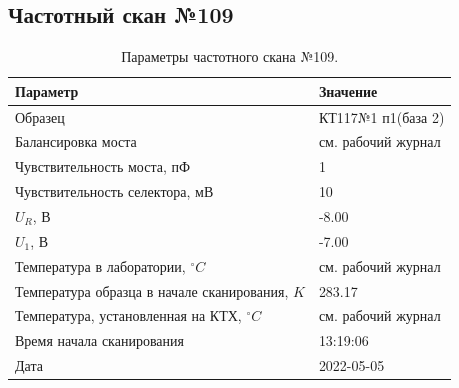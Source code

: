 \subsection{Частотный скан №109}
\begin{table}[!ht]
    \centering
    \caption{Параметры частотного скана №109.}
    \begin{tabular}{|l|l|}
        \hline
        Параметр                                       & Значение                  \\ \hline
        Образец                                        & КТ117№1 п1(база 2)        \\ \hline
        Балансировка моста                             & см. рабочий журнал        \\ \hline
        Чувствительность моста, пФ                     & 1                         \\ \hline
        Чувствительность селектора, мВ                 & 10                        \\ \hline
        $U_R$, В                                       & -8.00                     \\ \hline
        $U_1$, В                                       & -7.00                     \\ \hline
        Температура в лаборатории, $^\circ C$          & см. рабочий журнал        \\ \hline
        Температура образца в начале сканирования, $K$ & 283.17                    \\ \hline
        Температура, установленная на КТХ, $^\circ C$  & см. рабочий журнал        \\ \hline
        Время начала сканирования                      & 13:19:06                  \\ \hline
        Дата                                           & 2022-05-05                \\ \hline
    \end{tabular}
    \label{table:frequency_scan_109}
\end{table}


